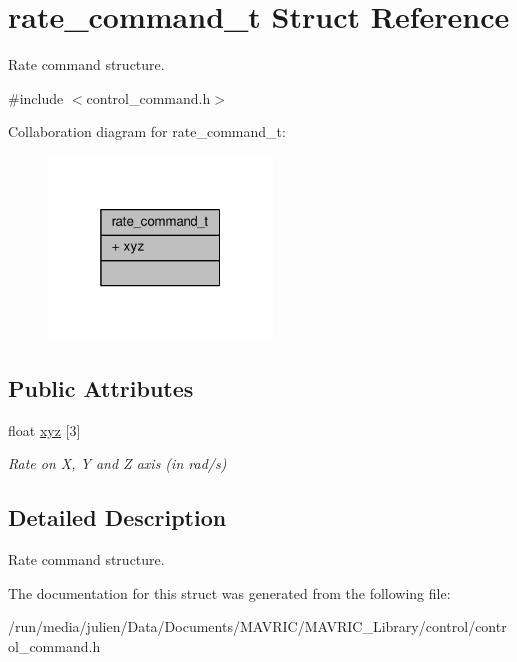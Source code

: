 \hypertarget{structrate__command__t}{\section{rate\+\_\+command\+\_\+t Struct Reference}
\label{structrate__command__t}
}


Rate command structure.  




{\ttfamily \#include $<$control\+\_\+command.\+h$>$}



Collaboration diagram for rate\+\_\+command\+\_\+t\+:
\nopagebreak
\begin{figure}[H]
\begin{center}
\leavevmode
\includegraphics[width=169pt]{structrate__command__t__coll__graph}
\end{center}
\end{figure}
\subsection*{Public Attributes}
\begin{DoxyCompactItemize}
\item 
\hypertarget{structrate__command__t_adbd636ca2a9850377b26b0e9b6ac73c2}{float \hyperlink{structrate__command__t_adbd636ca2a9850377b26b0e9b6ac73c2}{xyz} \mbox{[}3\mbox{]}}\label{structrate__command__t_adbd636ca2a9850377b26b0e9b6ac73c2}

\begin{DoxyCompactList}\small\item\em Rate on X, Y and Z axis (in rad/s) \end{DoxyCompactList}\end{DoxyCompactItemize}


\subsection{Detailed Description}
Rate command structure. 

The documentation for this struct was generated from the following file\+:\begin{DoxyCompactItemize}
\item 
/run/media/julien/\+Data/\+Documents/\+M\+A\+V\+R\+I\+C/\+M\+A\+V\+R\+I\+C\+\_\+\+Library/control/control\+\_\+command.\+h\end{DoxyCompactItemize}
